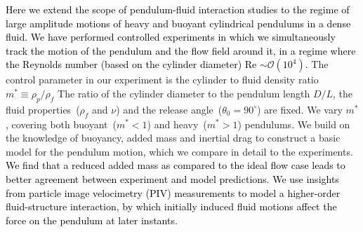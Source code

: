 \documentclass{jfm}
\begin{document}
\textcolor{black}{Here we extend the scope of pendulum-fluid interaction studies to the regime of large amplitude motions of  heavy and buoyant cylindrical pendulums in a dense fluid.}  %
\textcolor{black}{We have performed controlled experiments in which we simultaneously track the motion of the pendulum and the flow field around it, in a regime where the Reynolds number (based on the cylinder diameter) Re $\sim \mathcal{O}(10^4)$.} The control parameter in our experiment is the cylinder to fluid density ratio $m^* \equiv \rho_p/\rho_f$ The ratio of the cylinder diameter to the pendulum length $D/L$, the fluid properties~($\rho_f$ and $\nu$) and the release angle~($\theta_0 = 90^\circ$) are fixed. 
We vary $m^*$, covering both buoyant~($m^* < 1$) and heavy~($m^* > 1$) pendulums. We build on the knowledge of buoyancy, added mass and inertial drag to construct a basic model for the pendulum motion, which we compare in detail to the experiments. \textcolor{black}{We find that a reduced added mass as compared to the ideal flow case leads to better agreement between experiment and model predictions. We use insights from particle image velocimetry (PIV) measurements to model a higher-order fluid-structure interaction, by which initially induced fluid motions affect the force on the pendulum at later instants.}


%
\end{document}
